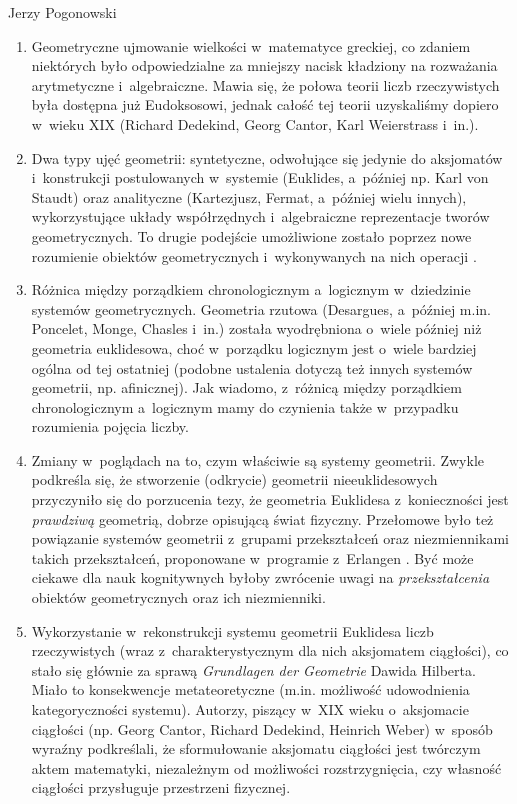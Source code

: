 \begin{newrevplenv}{Jerzy Pogonowski}
\begin{enumerate}

\item Geometryczne ujmowanie wielkości w~matematyce greckiej, co
zdaniem niektórych było odpowiedzialne za mniejszy nacisk
kładziony na rozważania arytmetyczne i~algebraiczne. Mawia się, że
połowa teorii liczb rzeczywistych była dostępna już Eudoksosowi,
jednak całość tej teorii uzyskaliśmy dopiero w~wieku XIX (Richard
Dedekind, Georg Cantor, Karl Weierstrass i~in.).

\item Dwa typy ujęć geometrii: syntetyczne, odwołujące się jedynie
do aksjomatów i~konstrukcji postulowanych w~systemie (Euklides, a~później np. Karl von Staudt) oraz analityczne (Kartezjusz, Fermat,
a~później wielu innych), wykorzystujące układy współrzędnych i~algebraiczne reprezentacje tworów geometrycznych. To drugie
podejście umożliwione zostało poprzez nowe rozumienie obiektów
geometrycznych i~wykonywanych na nich operacji \parencite{descartes_geometria_2015}.

\item Różnica między porządkiem chronologicznym a~logicznym w~dziedzinie systemów geometrycznych. Geometria rzutowa (Desargues,
a~później m.in. Poncelet, Monge, Chasles i~in.) została
wyodrębniona o~wiele później niż geometria euklidesowa, choć w~porządku logicznym jest o~wiele bardziej ogólna od tej ostatniej
(podobne ustalenia dotyczą też innych systemów geometrii, np.
afinicznej). Jak wiadomo, z~różnicą między porządkiem
chronologicznym a~logicznym mamy do czynienia także w~przypadku
rozumienia pojęcia liczby.

\item Zmiany w~poglądach na to, czym właściwie są systemy
geometrii. Zwykle podkreśla się, że stworzenie (odkrycie)
geometrii nieeuklidesowych przyczyniło się do porzucenia tezy, że
geometria Euklidesa z~konieczności jest {\em prawdziwą} geometrią,
dobrze opisującą świat fizyczny. Przełomowe było też powiązanie
systemów geometrii z~grupami przekształceń oraz niezmiennikami
takich przekształceń, proponowane w~programie z~Erlangen \parencite{klein_vergleichende_1872}. Być może ciekawe dla nauk kognitywnych byłoby zwrócenie
uwagi na {\em przekształcenia} obiektów geometrycznych oraz ich
niezmienniki.

\item Wykorzystanie w~rekonstrukcji systemu geometrii Euklidesa
liczb rzeczywistych (wraz z~charakterystycznym dla nich aksjomatem
ciągłości), co stało się głównie za sprawą {\em Grundlagen der
Geometrie} \parencite*{hilbert_grundlagen_1899} Dawida Hilberta. Miało to konsekwencje
metateoretyczne (m.in. możliwość udowodnienia kategoryczności
systemu). Autorzy, piszący w~XIX wieku o~aksjomacie ciągłości (np.
Georg Cantor, Richard Dedekind, Heinrich Weber) w~sposób wyraźny
podkreślali, że sformułowanie aksjomatu ciągłości jest twórczym
aktem matematyki, niezależnym od możliwości rozstrzygnięcia, czy
własność ciągłości przysługuje przestrzeni fizycznej.


\end{enumerate}
\end{newrevplenv}
